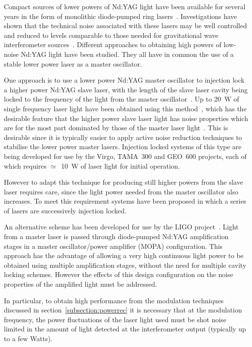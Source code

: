 \documentclass{article}
\begin{document}
Compact sources of lower powers of Nd:YAG light have been available
for several years in the form of monolithic diode-pumped ring
lasers~\cite{Kane1}.  Investigations have shown that the technical
noise associated with these lasers may be well controlled and reduced
to levels comparable to those needed for gravitational wave
interferometer sources~\cite{Kane2, Fritschel, Campbell, Rowan4,
Harb}. Different approaches to obtaining high powers of low-noise
Nd:YAG light have been studied. They all have in common the
use of a stable lower power laser as a master oscillator.

One approach is to use a lower power Nd:YAG master oscillator to
injection lock a higher power Nd:YAG slave laser, with the length of
the slave laser cavity being locked to the frequency of the light from
the master oscillator~\cite{Cregut, Nabors, Golla}. Up to 20~W of
single frequency laser light have been obtained using this
method~\cite{Shine}, which has the desirable feature that the higher
power slave laser light has noise properties which are for the most
part dominated by those of the master laser light~\cite{Farinas}. This
is desirable since it is typically easier to apply active noise
reduction techniques to stabilise the lower power master lasers.
Injection locked systems of this type are being developed for use by
the Virgo, TAMA~300 and GEO~600 projects, each of which requires
$\simeq$~10~W of laser light for initial operation.

However to adapt this technique for producing still higher powers from
the slave laser requires care, since the light power needed from the
master oscillator also increases. To meet this requirement systems
have been proposed in which a series of lasers are successively
injection locked.

An alternative scheme has been developed for use by the LIGO
project~\cite{Weichmann}. Light from a master laser is passed through
diode-pumped Nd:YAG amplification stages in a master oscillator/power
amplifier (MOPA) configuration. This approach has the advantage of
allowing a very high continuous light power to be
obtained using multiple amplification stages, without the need for
multiple cavity locking schemes.  However the
effects of this design configuration on the noise properties of the
amplified light must be addressed.

In particular, to obtain high performance from the modulation
techniques discussed in section~\ref{subsection:powerrec} it is
necessary that at the modulation frequency, the power fluctuations of
the laser light used must be shot noise limited in the amount of light
detected at the interferometer output (typically up to a few Watts).
\end{document}
